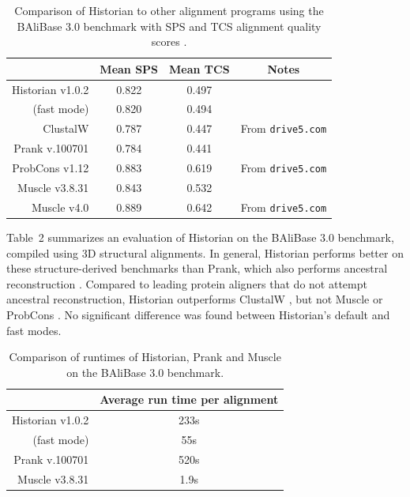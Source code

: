 \documentclass{bioinfo}
\begin{document}
\begin{table}
  \begin{tabular}{r|ccc}
    & Mean SPS & Mean TCS & Notes \\
    \hline
    Historian v1.0.2 & 0.822 & 0.497 & \\
    (fast mode) & 0.820 & 0.494 & \\
ClustalW & 0.787 & 0.447 & From {\tt drive5.com} \\
Prank v.100701 & 0.784 & 0.441 \\
ProbCons v1.12 & 0.883 & 0.619 & From {\tt drive5.com} \\
Muscle v3.8.31 & 0.843 & 0.532 & \\
Muscle v4.0 & 0.889 & 0.642 &  From {\tt drive5.com}
  \end{tabular}
  \caption{
    Comparison of Historian to other alignment programs using the BAliBase 3.0 benchmark
    with SPS and TCS alignment quality scores \citep{ThompsonEtAl2005}.
  }
\end{table}

Table~2 summarizes an evaluation of Historian
on the BAliBase 3.0 benchmark,
compiled using 3D structural alignments.
%
In general, Historian performs better on these structure-derived benchmarks than Prank,
which also performs ancestral reconstruction \citep{LoytynojaGoldman2008}.
Compared to leading protein aligners that do not attempt ancestral reconstruction,
Historian outperforms ClustalW \citep{LarkinEtAl2007}, but not Muscle \citep{Edgar2004b}
or ProbCons \citep{DoEtAl2005}. %
No significant difference was found between Historian's default and fast modes.

\begin{table}
  \begin{tabular}{r|c}
    & Average run time per alignment \\
    \hline
Historian v1.0.2 & 233s \\
 (fast mode) & 55s \\
Prank v.100701 & 520s \\
Muscle v3.8.31 & 1.9s \\
\end{tabular}
\caption{
    Comparison of runtimes of Historian, Prank and Muscle on the BAliBase 3.0 benchmark.
  }
\end{table}
\end{document}
